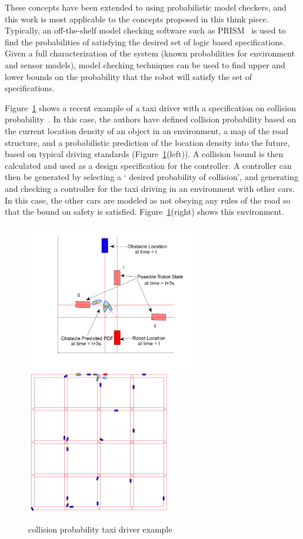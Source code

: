These concepts have been extended to using probabilistic model checkers, and this work is most applicable to the concepts proposed in this think piece. Typically, an off-the-shelf model checking software such as PRISM~\cite{prism} is used to find the probabilities of satisfying the desired set of logic based specifications. Given a full characterization of the system (known probabilities for environment and sensor models), model checking techniques can be used to find upper and lower bounds on the probability that the robot will satisfy the set of specifications.

Figure~\ref{fig:taxi-taxi} shows a recent example of a taxi driver with a specification on collision probability~\cite{johnson2012execution}. In this case, the authors have defined collision probability based on the current location density of an object in an environment, a map of the road structure, and a probabilistic prediction of the location density into the future, based on typical driving standards (Figure~\ref{fig:taxi-taxi}(left)). A collision bound is then calculated and used as a design specification for the controller. A controller can then be generated by selecting a ` desired probability of collision', and generating and  checking a controller for the taxi driving in an environment with other cars. In this case, the other cars are modeled as not obeying any rules of the road so that the bound on safety is satisfied. Figure~\ref{fig:taxi-taxi}(right) shows this environment. 

\begin{figure}[h] 
\centering
   \includegraphics[width=3.0in]{coll_prob_inst.pdf} 
   \includegraphics[width=2.5in]{taxi-driver.pdf} 
   \caption{collision probability taxi driver example}
   \label{fig:taxi-taxi}
\end{figure}

